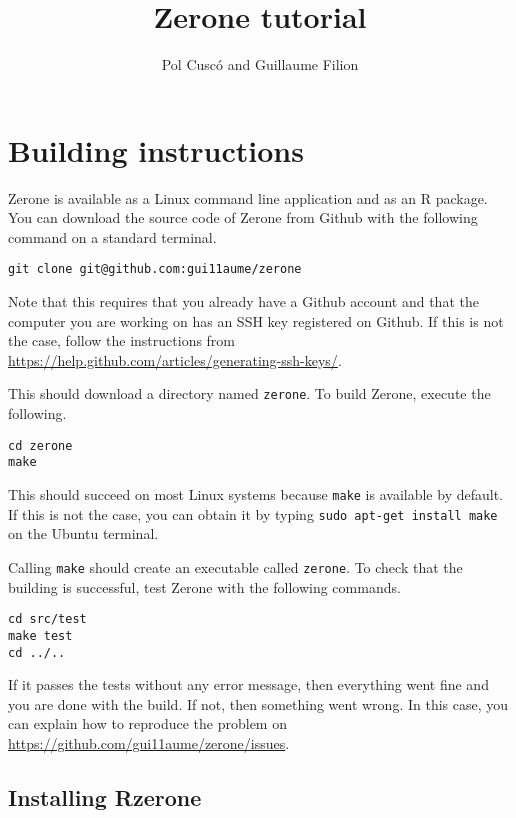 \documentclass[12pt]{article}
\title{Zerone tutorial}
\author{Pol Cusc\'o and Guillaume Filion}
\begin{document}
\maketitle

\section{Building instructions}

Zerone is available as a Linux command line application and as an R package.
You can download the source code of Zerone from Github with
the following command on a standard terminal.

\begin{verbatim}
git clone git@github.com:gui11aume/zerone
\end{verbatim}

Note that this requires that you already have a Github account
and that the computer you are working on has an SSH key registered
on Github. If this is not the case, follow the instructions from
\url{https://help.github.com/articles/generating-ssh-keys/}.

This should download a directory named \texttt{zerone}. To build
Zerone, execute the following.

\begin{verbatim}
cd zerone
make
\end{verbatim}

This should succeed on most Linux systems because \texttt{make} is
available by default. If this is not the case, you can obtain it by
typing \texttt{sudo apt-get install make} on the Ubuntu terminal.

Calling \texttt{make} should create an executable called
\texttt{zerone}. To check that the building is successful, test Zerone with
the following commands.

\begin{verbatim}
cd src/test
make test
cd ../..
\end{verbatim}

If it passes the tests without any error message, then everything went fine
and you are done with the build. If not, then something went
wrong. In this case, you can explain how to reproduce the problem
on \url{https://github.com/gui11aume/zerone/issues}.

\subsection{Installing Rzerone}
\end{document}
